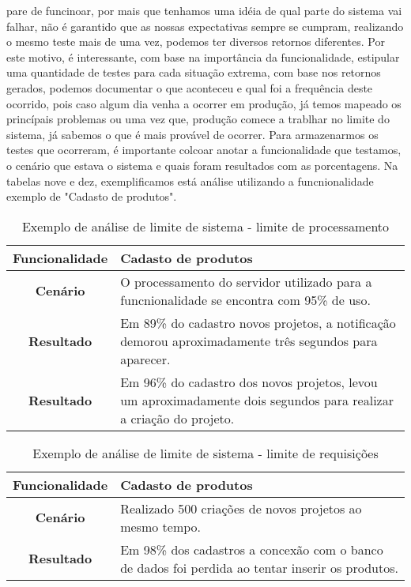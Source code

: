     pare de funcinoar, por mais que tenhamos uma idéia de qual parte do sistema
    vai falhar, não é garantido que as nossas expectativas sempre se cumpram,
    realizando o mesmo teste mais de uma vez, podemos ter diversos retornos
    diferentes. Por este motivo, é interessante, com base na importância da
    funcionalidade, estipular uma quantidade de testes para cada situação extrema,
    com base nos retornos gerados, podemos documentar o que aconteceu e qual foi
    a frequência deste ocorrido, pois caso algum dia venha a ocorrer em produção,
    já temos mapeado os princípais problemas ou uma vez que, produção comece a
    trablhar no limite do sistema, já sabemos o que é mais provável de ocorrer.
    Para armazenarmos os testes que ocorreram, é importante colcoar anotar a
    funcionalidade que testamos, o cenário que estava o sistema e quais foram
    resultados com as porcentagens. Na tabelas nove e dez, exemplificamos está análise
    utilizando a funcnionalidade exemplo de "Cadasto de produtos". \newline

    \begin{table}[h!]
      \centering
      \begin{tabular}{|c|p{10cm}|}
        \hline
        \textbf{Funcionalidade} &
        Cadasto de produtos \\ \hline
        \textbf{Cenário} &
        O processamento do servidor utilizado para a funcnionalidade se encontra
        com 95\% de uso. \\ \hline
        \textbf{Resultado} &
        Em 89\% do cadastro novos projetos, a notificação demorou aproximadamente
        três segundos para aparecer. \\ \hline
        \textbf{Resultado} &
        Em 96\% do cadastro dos novos projetos, levou um aproximadamente dois
        segundos para realizar a criação do projeto. \\ \hline
      \end{tabular}
      \caption{Exemplo de análise de limite de sistema - limite de processamento}
      \label{Tabela:9}
    \end{table}

    \begin{table}[h!]
      \centering
      \begin{tabular}{|c|p{10cm}|}
        \hline
        \textbf{Funcionalidade} &
        Cadasto de produtos \\ \hline
        \textbf{Cenário} &
        Realizado 500 criações de novos projetos ao mesmo tempo. \\ \hline
        \textbf{Resultado} &
        Em 98\% dos cadastros a concexão com o banco de dados foi perdida ao tentar
        inserir os produtos. \\ \hline
      \end{tabular}
      \caption{Exemplo de análise de limite de sistema - limite de requisições}
      \label{Tabela:9}
    \end{table}

